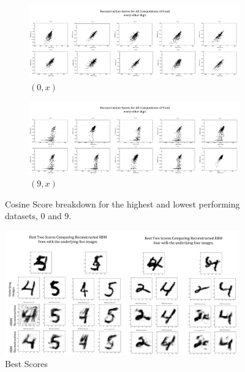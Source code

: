 \begin{figure}[h]
    \centering
    \begin{subfigure}[t]{1\textwidth}
        \includegraphics[width=\textwidth]{Assets/b.png}
        \caption{ $(0,x)$ }
      \label{F:Cosine-0-x-scores}
    \end{subfigure}
    \begin{subfigure}[t]{1\textwidth}
        \includegraphics[width=\textwidth]{Assets/(9,X)-ReconstructionScores.png}
        \caption{ $(9,x)$ }
      \label{F:Cosine-9-x-scores}
    \end{subfigure}
    \caption{Cosine Score breakdown for the highest and lowest performing datasets, 0 and 9.}\label{fig:mnist-worse-best-results}
\end{figure}

\begin{figure}[htb]
  \begin{center}
    \includegraphics[width=0.9\textwidth]{Assets/results/orbm-Best-2-results.png}
  \end{center}
  \caption{Best Scores}
  \label{F:Best-Results-MNIST}
\end{figure}

